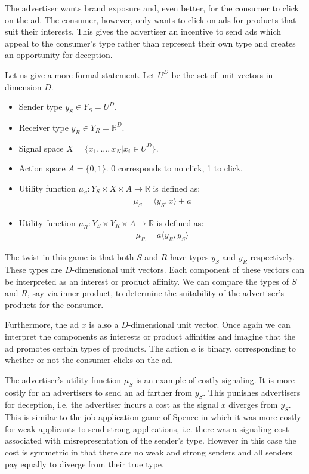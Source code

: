 \documentclass{article}
\begin{document}
The advertiser wants brand exposure and, even better, for the consumer to click on the ad. The consumer, however, only wants to click on ads for products that suit their interests. This gives the advertiser an incentive to send ads which appeal to the consumer's type rather than represent their own type and creates an opportunity for deception.

Let us give a more formal statement. Let $U^D$ be the set of unit vectors in dimension $D$.
\begin{itemize}
    \item Sender type $y_S \in Y_S = U^D$.
    \item Receiver type $y_R \in Y_R = \mathbb{R}^D $.
    \item Signal space $X = \lbrace x_1, ..., x_N \vert x_i \in U^D \rbrace$.
    \item Action space $A = \lbrace 0,1 \rbrace$. 0 corresponds to no click, 1 to click.
    \item Utility function $\mu_S: Y_S \times X \times A \rightarrow \mathbb{R}$ is defined as:
    \begin{align*}
        \mu_S = \langle y_S, x \rangle + a %
    \end{align*}
    \item Utility function $\mu_R: Y_S \times Y_R \times A \rightarrow \mathbb{R}$ is defined as:
    \begin{align*}
        \mu_R = a \langle y_R, y_S \rangle
    \end{align*}
\end{itemize}

\noindent The twist in this game is that both $S$ and $R$ have types $y_S$ and $y_R$ respectively. These types are $D$-dimensional unit vectors. Each component of these vectors can be interpreted as an interest or product affinity. We can compare the types of $S$ and $R$, say via inner product, to determine the suitability of the advertiser's products for the consumer.

Furthermore, the ad $x$ is also a $D$-dimensional unit vector. Once again we can interpret the components as interests or product affinities and imagine that the ad promotes certain types of products. The action $a$ is binary, corresponding to whether or not the consumer clicks on the ad.

The advertiser's utility function $\mu_S$ is an example of costly signaling. It is more costly for an advertisers to send an ad farther from $y_S$. This punishes advertisers for deception, i.e. the advertiser incurs a cost as the signal $x$ diverges from $y_S$. This is similar to the job application game of Spence in which it was more costly for weak applicants to send strong applications, i.e. there was a signaling cost associated with misrepresentation of the sender's type. However in this case the cost is symmetric in that there are no weak and strong senders and all senders pay equally to diverge from their true type.
\end{document}
